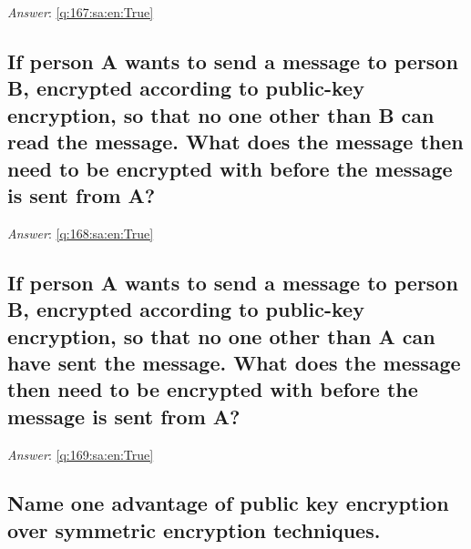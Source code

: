 \documentclass[a4paper,11pt,oneside]{article}
\begin{document}
\begin{sloppypar}
\vspace{1cm}

\textit{Answer}: \autoref{q:167:sa:en:True}



\subsection{If person A wants to send a message to person B, encrypted according to public-key encryption, so that no one other than B can read the message. What does the message then need to be encrypted with before the message is sent from A?}

\label{q:168:sa:en:False}

\vspace{2cm}

\noindent\makebox[\textwidth]{\hrulefill}

\vspace{1cm}

\textit{Answer}: \autoref{q:168:sa:en:True}



\subsection{If person A wants to send a message to person B, encrypted according to public-key encryption, so that no one other than A can have sent the message. What does the message then need to be encrypted with before the message is sent from A?}

\label{q:169:sa:en:False}

\vspace{2cm}

\noindent\makebox[\textwidth]{\hrulefill}

\vspace{1cm}

\textit{Answer}: \autoref{q:169:sa:en:True}



\subsection{Name one advantage of public key encryption over symmetric encryption techniques.}

\label{q:170:sa:en:False}

\vspace{2cm}

\noindent\makebox[\textwidth]{\hrulefill}

\vspace{1cm}


\end{sloppypar}
\end{document}
